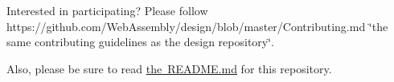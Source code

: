 Interested in participating? Please follow https\+://github.com/\+Web\+Assembly/design/blob/master/\+Contributing.\+md \char`\"{}the same contributing guidelines as the design repository\char`\"{}.

Also, please be sure to read \mbox{\hyperlink{md__r_e_a_d_m_e}{the R\+E\+A\+D\+ME.md}} for this repository. 